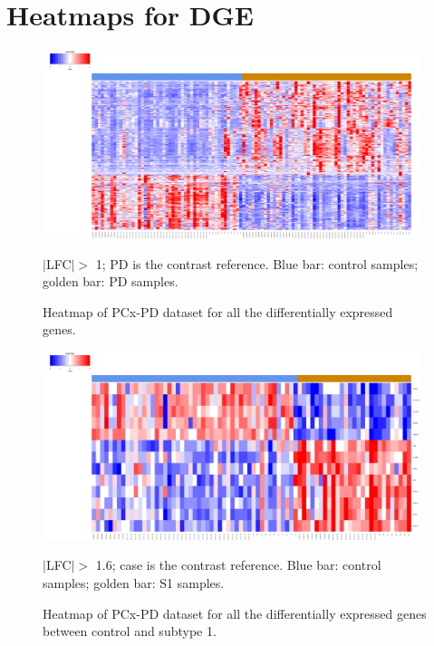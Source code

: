 \chapter{Heatmaps for DGE} \label{de-heatmaps}

\begin{figure}[!ht]
    \centerline{\includegraphics[width = 11cm]{Figures/DE heatmap/CTLvsPD-PCx_all.png}}
\caption{Heatmap of PCx-PD dataset for all the differentially expressed genes.}
\label{DE-pcx-pd}
\footnotesize $|$LFC$| >$ 1; PD is the contrast reference. Blue bar: control samples; golden bar: PD samples.
\end{figure}

\begin{figure}[!ht]
    \centerline{\includegraphics[width = 11cm]{Figures/DE heatmap/CTLvs1_PD-PCx.png}}
\caption{Heatmap of PCx-PD dataset for all the differentially expressed genes between control and subtype 1.}
\footnotesize $|$LFC$| >$ 1.6; case is the contrast reference. Blue bar: control samples; golden bar: S1 samples.
\end{figure}

